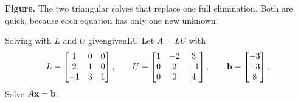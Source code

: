 \documentclass[11pt]{article}
\begin{document}
\textbf{Figure.} The two triangular solves that replace one full elimination. Both are quick, because each equation has only one new unknown.

\begin{exmp}{Solving with $L$ and $U$ given}{givenLU}
Let $A=LU$ with
\[
L=\begin{bmatrix}1&0&0\\2&1&0\\-1&3&1\end{bmatrix},\qquad U=\begin{bmatrix}1&-2&3\\0&2&-1\\0&0&4\end{bmatrix},\qquad \mathbf{b}=\begin{bmatrix}-3\\-3\\8\end{bmatrix}.
\]
Solve $A\mathbf{x}=\mathbf{b}$.


\end{exmp}
\end{document}
